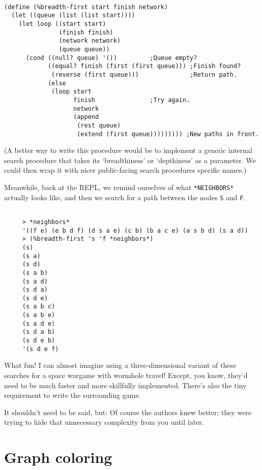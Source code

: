 \documentclass[12pt,openright,draft]{book}
\begin{document}
\begin{verbatim}

(define (%breadth-first start finish network)
  (let ((queue (list (list start))))
    (let loop ((start start)
               (finish finish)
               (network network)
               (queue queue))
      (cond ((null? queue) '())         ;Queue empty?
            ((equal? finish (first (first queue))) ;Finish found?
             (reverse (first queue)))              ;Return path.
            (else
             (loop start
                   finish               ;Try again.
                   network
                   (append
                    (rest queue)
                    (extend (first queue))))))))) ;New paths in front.

\end{verbatim}

(A better way to write this procedure would be to implement a generic
internal search procedure that takes its `breadthiness' or
`depthiness' as a parameter.  We could then wrap it with nicer
public-facing search procedures specific names.)

Meanwhile, back at the REPL, we remind ourselves of what
\verb|*NEIGHBORS*| actually looks like, and then we search for a path
between the nodes \verb|S| and \verb|F|.

\begin{verbatim}

     > *neighbors*
     '((f e) (e b d f) (d s a e) (c b) (b a c e) (a s b d) (s a d))
     > (%breadth-first 's 'f *neighbors*)
     (s)
     (s a)
     (s d)
     (s a b)
     (s a d)
     (s d a)
     (s d e)
     (s a b c)
     (s a b e)
     (s a d e)
     (s d a b)
     (s d e b)
     '(s d e f)

\end{verbatim}

What fun!  I can almost imagine using a three-dimensional variant of
these searches for a space wargame with wormhole travel!  Except, you
know, they'd need to be much faster and more skillfully implemented.
There's also the tiny requirement to write the surrounding game.

It shouldn't need to be said, but: Of course the authors knew better;
they were trying to hide that unnecessary complexity from you until
later.

\section{Graph coloring}
\end{document}
